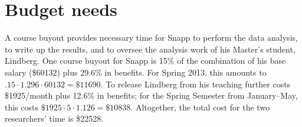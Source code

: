 \documentclass[12pt]{article}
\begin{document}
\section{Budget needs}
A course buyout provides necessary time for Snapp to perform the data
analysis, to write up the results, and to oversee the analysis work of
his Master's student, Lindberg.  One course buyout for Snapp is 15\%
of the combination of his base salary (\$60132) plus 29.6\% in
benefits. For Spring 2013, this amounts to $.15 \cdot 1.296\cdot
60132=\$11690$.  To release Lindberg from his teaching further costs
\$1925/month plus 12.6\% in benefits; for the Spring Semester from
January--May, this costs $\$1925 \cdot 5 \cdot 1.126 = \$10838$.
Altogether, the total cost for the two researchers' time is \$22528.


\pagebreak
\printbibliography
\end{document}

